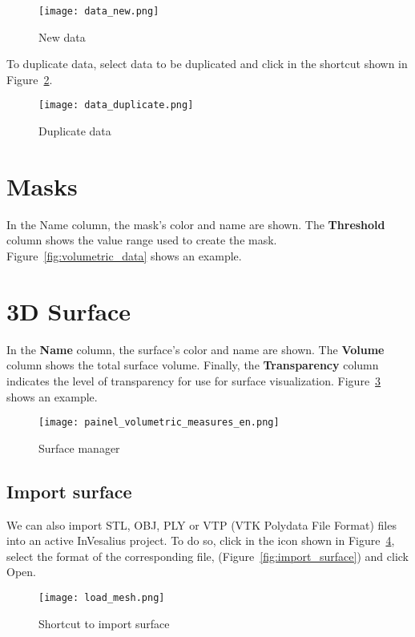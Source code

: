 \begin{figure}[!htb]
\centering
\texttt{[image: data\_new.png]}
\caption{New data}
\label{fig:new_data}
\end{figure}

To duplicate data, select data to be duplicated and click in the shortcut shown in Figure~\ref{fig:duplicate_data}.

\begin{figure}[!htb]
\centering
\texttt{[image: data\_duplicate.png]}
\caption{Duplicate data}
\label{fig:duplicate_data}
\end{figure}

\newpage

\section{Masks}

In the Name column, the mask’s color and name are shown. The \textbf{Threshold} column shows the value range used to create the mask. Figure~\ref{fig:volumetric_data} shows an example.

\section{3D Surface}

In the \textbf{Name} column, the surface’s color and name are shown. The \textbf{Volume} column shows the total surface volume. Finally, the \textbf{Transparency} column indicates the level of transparency for use for surface visualization. Figure~\ref{fig:surface_manager} shows an example.

\begin{figure}[!htb]
\centering
\texttt{[image: painel\_volumetric\_measures\_en.png]}
\caption{Surface manager}
\label{fig:surface_manager}
\end{figure}

\subsection{Import surface}

We can also import STL, OBJ, PLY or VTP (VTK Polydata File Format) files into an active InVesalius project. To do so, click in the icon shown in Figure~\ref{fig:import_stl}, select the format of the corresponding file, (Figure~\ref{fig:import_surface}) and click Open.

\begin{figure}[!htb]
\centering
\texttt{[image: load\_mesh.png]}
\caption{Shortcut to import surface }
\label{fig:import_stl}
\end{figure}

